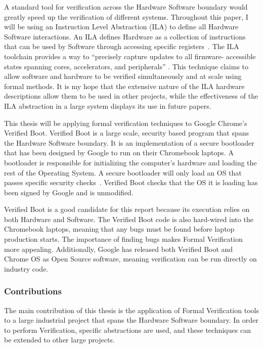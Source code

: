 \documentclass[../report.tex]{subfiles}
\begin{document}
A standard tool for verification across the Hardware Software boundary would
greatly speed up the verification of different systems.
Throughout this paper, I will be using an Instruction Level Abstraction (ILA) to
define all Hardware Software interactions.
An ILA defines Hardware as a collection of instructions that can be used by
Software through accessing specific registers~\cite{ila}.
The ILA toolchain provides a way to ``precisely capture updates to all firmware-
accessible states spanning cores, accelerators, and peripherals''
\cite{ila-template}.
This technique claims to allow software and hardware to be verified simultaneously and at scale using formal methods.
It is my hope that the extensive nature of the ILA hardware descriptions allow
them to be used in other projects, while the effectiveness of the ILA abstraction
in a large system displays its use in future papers. 

This thesis will be applying formal verification techniques to Google Chrome's
Verified Boot.
Verified Boot is a large scale, security based program that spans the Hardware
Software boundary. 
It is an implementation of a secure bootloader that has been designed by Google to run on their Chromebook laptops.
A bootloader is responsible for initializing the computer's hardware and
loading the rest of the Operating System.
A secure bootloader will only load an OS that passes specific
security checks~\cite{secure-bootloader}.
Verified Boot checks that the OS it is loading has been signed by Google and is
unmodified.

Verified Boot is a good candidate for this report because its execution relies
on both Hardware and Software.
The Verified Boot code is also hard-wired into the Chromebook laptops, meaning
that any bugs must be found before laptop production starts.
The importance of finding bugs makes Formal Verification more appealing.
Additionally, Google has released both Verified Boot and Chrome OS as Open
Source software, meaning verification can be run directly on industry code.

\subsubsection{Contributions}

The main contribution of this thesis is the application of Formal Verification
tools to a large industrial project that spans the Hardware Software boundary.
In order to perform Verification, specific abstractions are used, and these
techniques can be extended to other large projects.
\end{document}
